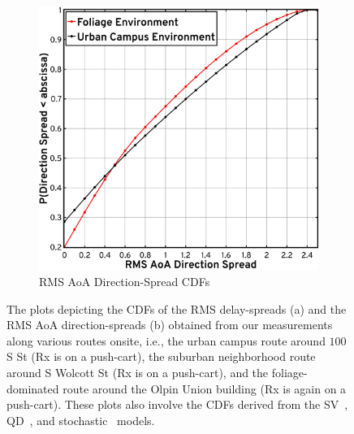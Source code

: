 \documentclass[12pt, draftcls, onecolumn]{IEEEtran}
\begin{document}
{\begin{figure} [t]
\begin{subfigure}{0.495\linewidth}
        \includegraphics[width=1.0\linewidth]{figs/rms_direction_spread.pdf}
        \caption{RMS AoA Direction-Spread CDFs}
        \label{F11b}
    \end{subfigure}
    \vspace{-8mm}
    \caption{The plots depicting the CDFs of the RMS delay-spreads (a) and the RMS AoA direction-spreads (b) obtained from our measurements along various routes onsite, i.e., the urban campus route around $100$ S St (Rx is on a push-cart), the suburban neighborhood route around S Wolcott St (Rx is on a push-cart), and the foliage-dominated route around the Olpin Union building (Rx is again on a push-cart). These plots also involve the CDFs derived from the SV~\cite{SV_Molisch}, QD~\cite{QDC_NIST}, and stochastic~\cite{Indoor60G} models.}
    \label{F11}
\end{figure}

}
\end{document}
